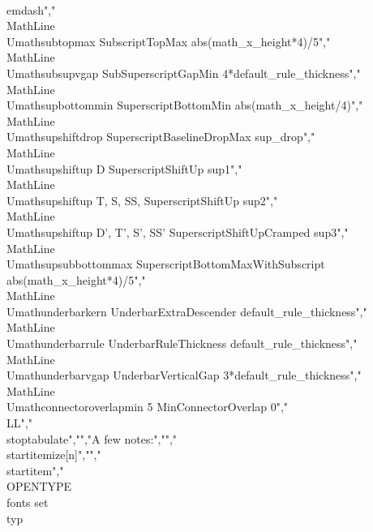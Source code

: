   {\\emdash}","\\MathLine{\\Umathsubtopmax}                {}   {}                     {SubscriptTopMax}                         {abs(math_x_height*4)/5}","\\MathLine{\\Umathsubsupvgap}               {}   {}                     {SubSuperscriptGapMin}                    {4*default_rule_thickness}","\\MathLine{\\Umathsupbottommin}             {}   {}                     {SuperscriptBottomMin}                    {abs(math_x_height/4)}","\\MathLine{\\Umathsupshiftdrop}             {}   {}                     {SuperscriptBaselineDropMax}              {sup_drop}","\\MathLine{\\Umathsupshiftup}               {}   {D}                    {SuperscriptShiftUp}                      {sup1}","\\MathLine{\\Umathsupshiftup}               {}   {T, S, SS,}            {SuperscriptShiftUp}                      {sup2}","\\MathLine{\\Umathsupshiftup}               {}   {D', T', S', SS'}      {SuperscriptShiftUpCramped}               {sup3}","\\MathLine{\\Umathsupsubbottommax}          {}   {}                     {SuperscriptBottomMaxWithSubscript}       {abs(math_x_height*4)/5}","\\MathLine{\\Umathunderbarkern}             {}   {}                     {UnderbarExtraDescender}                  {default_rule_thickness}","\\MathLine{\\Umathunderbarrule}             {}   {}                     {UnderbarRuleThickness}                   {default_rule_thickness}","\\MathLine{\\Umathunderbarvgap}             {}   {}                     {UnderbarVerticalGap}                     {3*default_rule_thickness}","\\MathLine{\\Umathconnectoroverlapmin}      {5}  {}                     {MinConnectorOverlap}                     {0}","\\LL","\\stoptabulate","","A few notes:","","\\startitemize[n]","","\\startitem","    \\OPENTYPE\\ fonts set \\typ 